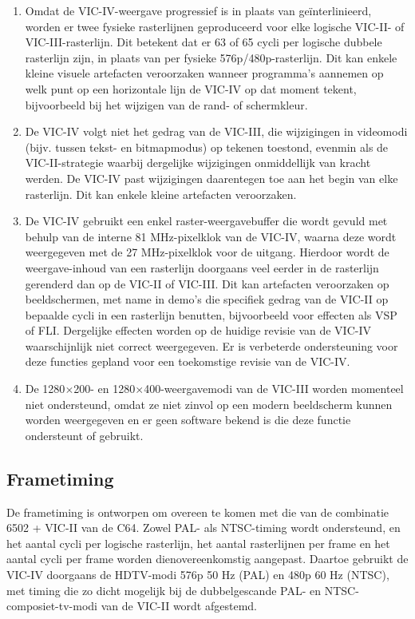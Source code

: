 \begin{enumerate}
\item Omdat de VIC-IV-weergave progressief is in plaats van geïnterlinieerd, worden er twee fysieke rasterlijnen geproduceerd voor elke logische VIC-II- of VIC-III-rasterlijn. Dit betekent dat er 63 of 65 cycli per logische dubbele rasterlijn zijn, in plaats van per fysieke 576p/480p-rasterlijn. Dit kan enkele kleine visuele artefacten veroorzaken wanneer programma's aannemen op welk punt op een horizontale lijn de VIC-IV op dat moment tekent, bijvoorbeeld bij het wijzigen van de rand- of schermkleur.\item De VIC-IV volgt niet het gedrag van de VIC-III, die wijzigingen in videomodi (bijv. tussen tekst- en bitmapmodus) op tekenen toestond, evenmin als de VIC-II-strategie waarbij dergelijke wijzigingen onmiddellijk van kracht werden. De VIC-IV past wijzigingen daarentegen toe aan het begin van elke rasterlijn. Dit kan enkele kleine artefacten veroorzaken.\item De VIC-IV gebruikt een enkel raster-weergavebuffer die wordt gevuld met behulp van de interne 81 MHz-pixelklok van de VIC-IV, waarna deze wordt weergegeven met de 27 MHz-pixelklok voor de uitgang. Hierdoor wordt de weergave-inhoud van een rasterlijn doorgaans veel eerder in de rasterlijn gerenderd dan op de VIC-II of VIC-III. Dit kan artefacten veroorzaken op beeldschermen, met name in demo's die specifiek gedrag van de VIC-II op bepaalde cycli in een rasterlijn benutten, bijvoorbeeld voor effecten als VSP of FLI. Dergelijke effecten worden op de huidige revisie van de VIC-IV waarschijnlijk niet correct weergegeven. Er is verbeterde ondersteuning voor deze functies gepland voor een toekomstige revisie van de VIC-IV. \item De 1280$\times$200- en 1280$\times$400-weergavemodi van de VIC-III worden momenteel niet ondersteund, omdat ze niet zinvol op een modern beeldscherm kunnen worden weergegeven en er geen software bekend is die deze functie ondersteunt of gebruikt.
\end{enumerate}

\subsection{Frametiming}

De frametiming is ontworpen om overeen te komen met die van de combinatie 6502 + VIC-II van de C64. Zowel PAL- als NTSC-timing wordt ondersteund, en het aantal cycli per logische rasterlijn, het aantal rasterlijnen per frame en het aantal cycli per frame worden dienovereenkomstig aangepast. Daartoe gebruikt de VIC-IV doorgaans de HDTV-modi 576p 50 Hz (PAL) en 480p 60 Hz (NTSC), met timing die zo dicht mogelijk bij de dubbelgescande PAL- en NTSC-composiet-tv-modi van de VIC-II wordt afgestemd.

